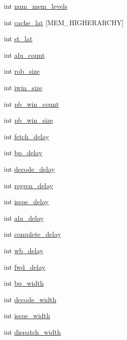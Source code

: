 \begin{DoxyCompactItemize}
\item 
int \hyperlink{classconfig_ae2064ad29481d05bec60ff9a10775c8b}{num\_\-mem\_\-levels}
\item 
int \hyperlink{classconfig_a18d19c63e34e1d1bf73dce6d945ad624}{cache\_\-lat} \mbox{[}MEM\_\-HIGHERARCHY\mbox{]}
\item 
int \hyperlink{classconfig_a56fb441e18e865131359adfc0ea56c2a}{st\_\-lat}
\item 
int \hyperlink{classconfig_a881b8c04dd7ca3bf08cf1bc679608a2e}{alu\_\-count}
\item 
int \hyperlink{classconfig_aecfafe8bd9d2dc97abde0730d59f6f9d}{rob\_\-size}
\item 
int \hyperlink{classconfig_a60ce0b8af7c4fbe8839ccf4d46b5be60}{iwin\_\-size}
\item 
int \hyperlink{classconfig_a48b2da3ec3a4b6ea4660771f23ba1582}{pb\_\-win\_\-count}
\item 
int \hyperlink{classconfig_a5dde15659f2775908ca310ed84270a8d}{pb\_\-win\_\-size}
\item 
int \hyperlink{classconfig_a91da818c1e663a984f2a1590df385dc8}{fetch\_\-delay}
\item 
int \hyperlink{classconfig_ac32c79ca2541862ab10e332835726ac7}{bp\_\-delay}
\item 
int \hyperlink{classconfig_a872974c5580ad2deb7a383c11f089b68}{decode\_\-delay}
\item 
int \hyperlink{classconfig_aa72ae4e6e9040f2f1402b9b09bcbd026}{regren\_\-delay}
\item 
int \hyperlink{classconfig_a55776db7f0ec934f45511861b401d615}{issue\_\-delay}
\item 
int \hyperlink{classconfig_a44f960416e7b458fe0d8c9fb0712d905}{alu\_\-delay}
\item 
int \hyperlink{classconfig_a369164f22ea95fa960db882496fdb362}{complete\_\-delay}
\item 
int \hyperlink{classconfig_a19565b08815a3a80c62393a062255225}{wb\_\-delay}
\item 
int \hyperlink{classconfig_a33bd64d9413ee02e75e5417dc831c745}{fwd\_\-delay}
\item 
int \hyperlink{classconfig_aa1361f6a730b6a397cbc0eab017b8370}{bp\_\-width}
\item 
int \hyperlink{classconfig_a6c7d857d48cac72b22a8f92811a81332}{decode\_\-width}
\item 
int \hyperlink{classconfig_a296691b2dd0273f25096fde73677eff1}{issue\_\-width}
\item 
int \hyperlink{classconfig_aec11bf6374063a368b518d0e11eb6144}{dispatch\_\-width}

\end{DoxyCompactItemize}
